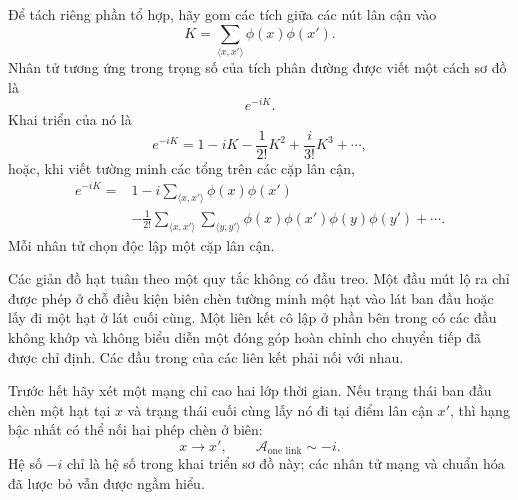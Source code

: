 Để tách riêng phần tổ hợp, hãy gom các tích giữa các nút lân cận vào
\begin{equation}
K=\sum_{\langle x,x'\rangle}\phi(x)\phi(x').
\end{equation}
Nhân tử tương ứng trong trọng số của tích phân đường được viết một cách sơ đồ là
\begin{equation}
e^{-iK}.
\end{equation}
Khai triển của nó là
\begin{equation}
e^{-iK}
=1-iK-\frac{1}{2!}K^2+\frac{i}{3!}K^3+\cdots,
\end{equation}
hoặc, khi viết tường minh các tổng trên các cặp lân cận,
\begin{align}
e^{-iK}
={}&1
-i\sum_{\langle x,x'\rangle}\phi(x)\phi(x')
\nonumber\\
&-\frac{1}{2!}
\sum_{\langle x,x'\rangle}
\sum_{\langle y,y'\rangle}
\phi(x)\phi(x')\phi(y)\phi(y')
+\cdots .
\end{align}
Mỗi nhân tử chọn độc lập một cặp lân cận.

Các giản đồ hạt tuân theo một quy tắc không có đầu treo. Một đầu mút lộ ra chỉ được phép ở chỗ điều kiện biên chèn tường minh một hạt vào lát ban đầu hoặc lấy đi một hạt ở lát cuối cùng. Một liên kết cô lập ở phần bên trong có các đầu không khớp và không biểu diễn một đóng góp hoàn chỉnh cho chuyển tiếp đã được chỉ định. Các đầu trong của các liên kết phải nối với nhau.

Trước hết hãy xét một mạng chỉ cao hai lớp thời gian. Nếu trạng thái ban đầu chèn một hạt tại \(x\) và trạng thái cuối cùng lấy nó đi tại điểm lân cận \(x'\), thì hạng bậc nhất có thể nối hai phép chèn ở biên:
\begin{equation}
x\longrightarrow x',
\qquad
\mathcal{A}_{\text{one link}}\sim -i.
\end{equation}
Hệ số \(-i\) chỉ là hệ số trong khai triển sơ đồ này; các nhân tử mạng và chuẩn hóa đã lược bỏ vẫn được ngầm hiểu.

\begin{classroomqa}
\end{classroomqa}


